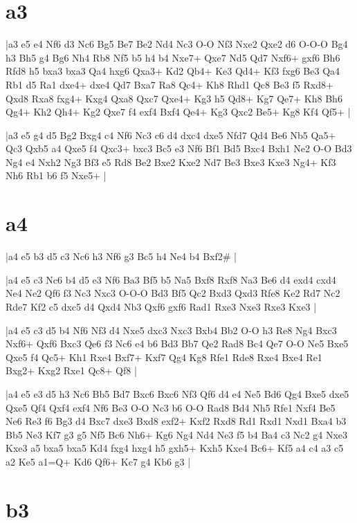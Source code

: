 \section{a3}

\whitename{}
\blackname{}
\makegametitle
|a3 e5 e4 Nf6 d3 Nc6 Bg5 Be7 Be2 Nd4 Nc3 O-O Nf3 Nxe2 Qxe2 d6 O-O-O Bg4 h3 Bh5 g4 Bg6 Nh4 Rb8 Nf5 b5 h4 b4 Nxe7+ Qxe7 Nd5 Qd7 Nxf6+ gxf6 Bh6 Rfd8 h5 bxa3 bxa3 Qa4 hxg6 Qxa3+ Kd2 Qb4+ Ke3 Qd4+ Kf3 fxg6 Be3 Qa4 Rb1 d5 Ra1 dxe4+ dxe4 Qd7 Bxa7 Ra8 Qc4+ Kh8 Rhd1 Qc8 Be3 f5 Rxd8+ Qxd8 Rxa8 fxg4+ Kxg4 Qxa8 Qxc7 Qxe4+ Kg3 h5 Qd8+ Kg7 Qe7+ Kh8 Bh6 Qg4+ Kh2 Qh4+ Kg2 Qxe7 f4 exf4 Bxf4 Qe4+ Kg3 Qxc2 Be5+ Kg8 Kf4 Qf5+  |

\whitename{}
\blackname{}
\makegametitle
|a3 e5 g4 d5 Bg2 Bxg4 c4 Nf6 Nc3 c6 d4 dxc4 dxe5 Nfd7 Qd4 Be6 Nb5 Qa5+ Qc3 Qxb5 a4 Qxe5 f4 Qxc3+ bxc3 Bc5 e3 Nf6 Bf1 Bd5 Bxc4 Bxh1 Ne2 O-O Bd3 Ng4 e4 Nxh2 Ng3 Bf3 e5 Rd8 Be2 Bxe2 Kxe2 Nd7 Be3 Bxe3 Kxe3 Ng4+ Kf3 Nh6 Rb1 b6 f5 Nxe5+  |

\section{a4}

\whitename{}
\blackname{}
\makegametitle
|a4 e5 b3 d5 c3 Nc6 h3 Nf6 g3 Bc5 h4 Ne4 b4 Bxf2\#  |

\whitename{}
\blackname{}
\makegametitle
|a4 e5 c3 Nc6 b4 d5 e3 Nf6 Ba3 Bf5 b5 Na5 Bxf8 Rxf8 Na3 Be6 d4 exd4 cxd4 Ne4 Ne2 Qf6 f3 Nc3 Nxc3 O-O-O Bd3 Bf5 Qc2 Bxd3 Qxd3 Rfe8 Ke2 Rd7 Nc2 Rde7 Kf2 c5 dxc5 d4 Qxd4 Nb3 Qxf6 gxf6 Rad1 Rxe3 Nxe3 Rxe3 Kxe3  |

\whitename{}
\blackname{}
\makegametitle
|a4 e5 c3 d5 b4 Nf6 Nf3 d4 Nxe5 dxc3 Nxc3 Bxb4 Bb2 O-O h3 Re8 Ng4 Bxc3 Nxf6+ Qxf6 Bxc3 Qe6 f3 Nc6 e4 b6 Bd3 Bb7 Qe2 Rad8 Bc4 Qe7 O-O Ne5 Bxe5 Qxe5 f4 Qc5+ Kh1 Rxe4 Bxf7+ Kxf7 Qg4 Kg8 Rfe1 Rde8 Rxe4 Bxe4 Re1 Bxg2+ Kxg2 Rxe1 Qc8+ Qf8  |

\whitename{}
\blackname{}
\makegametitle
|a4 e5 e3 d5 h3 Nc6 Bb5 Bd7 Bxc6 Bxc6 Nf3 Qf6 d4 e4 Ne5 Bd6 Qg4 Bxe5 dxe5 Qxe5 Qf4 Qxf4 exf4 Nf6 Be3 O-O Nc3 b6 O-O Rad8 Bd4 Nh5 Rfe1 Nxf4 Be5 Ne6 Re3 f6 Bg3 d4 Bxc7 dxe3 Bxd8 exf2+ Kxf2 Rxd8 Rd1 Rxd1 Nxd1 Bxa4 b3 Bb5 Ne3 Kf7 g3 g5 Nf5 Bc6 Nh6+ Kg6 Ng4 Nd4 Ne3 f5 b4 Ba4 c3 Nc2 g4 Nxe3 Kxe3 a5 bxa5 bxa5 Kd4 fxg4 hxg4 h5 gxh5+ Kxh5 Kxe4 Bc6+ Kf5 a4 c4 a3 c5 a2 Ke5 a1=Q+ Kd6 Qf6+ Kc7 g4 Kb6 g3  |

\section{b3}

